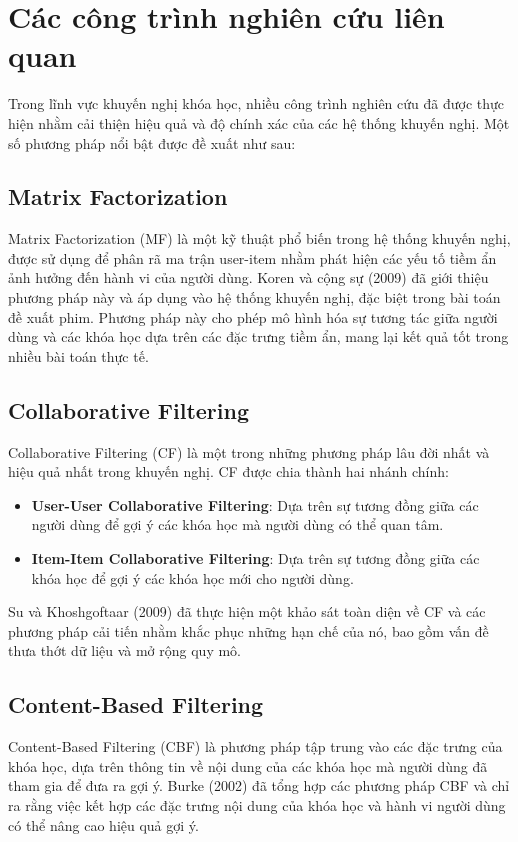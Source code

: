 \section{Các công trình nghiên cứu liên quan}

Trong lĩnh vực khuyến nghị khóa học, nhiều công trình nghiên cứu đã được thực hiện nhằm cải thiện hiệu quả và độ chính xác của các hệ thống khuyến nghị. Một số phương pháp nổi bật được đề xuất như sau:

\subsection{Matrix Factorization}

Matrix Factorization (MF) là một kỹ thuật phổ biến trong hệ thống khuyến nghị, được sử dụng để phân rã ma trận user-item nhằm phát hiện các yếu tố tiềm ẩn ảnh hưởng đến hành vi của người dùng. Koren và cộng sự (2009) đã giới thiệu phương pháp này và áp dụng vào hệ thống khuyến nghị, đặc biệt trong bài toán đề xuất phim. Phương pháp này cho phép mô hình hóa sự tương tác giữa người dùng và các khóa học dựa trên các đặc trưng tiềm ẩn, mang lại kết quả tốt trong nhiều bài toán thực tế.

\subsection{Collaborative Filtering}

Collaborative Filtering (CF) là một trong những phương pháp lâu đời nhất và hiệu quả nhất trong khuyến nghị. CF được chia thành hai nhánh chính:
\begin{itemize}
    \item \textbf{User-User Collaborative Filtering}: Dựa trên sự tương đồng giữa các người dùng để gợi ý các khóa học mà người dùng có thể quan tâm.
    \item \textbf{Item-Item Collaborative Filtering}: Dựa trên sự tương đồng giữa các khóa học để gợi ý các khóa học mới cho người dùng.
\end{itemize}
Su và Khoshgoftaar (2009) đã thực hiện một khảo sát toàn diện về CF và các phương pháp cải tiến nhằm khắc phục những hạn chế của nó, bao gồm vấn đề thưa thớt dữ liệu và mở rộng quy mô.

\subsection{Content-Based Filtering}

Content-Based Filtering (CBF) là phương pháp tập trung vào các đặc trưng của khóa học, dựa trên thông tin về nội dung của các khóa học mà người dùng đã tham gia để đưa ra gợi ý. Burke (2002) đã tổng hợp các phương pháp CBF và chỉ ra rằng việc kết hợp các đặc trưng nội dung của khóa học và hành vi người dùng có thể nâng cao hiệu quả gợi ý.

